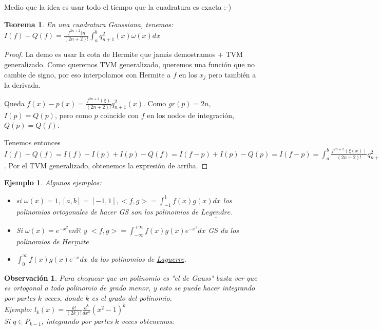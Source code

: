 \documentclass[10pt,a4paper,final]{report}
\newtheorem{theorem}{Teorema}
\newtheorem{observation}{Observación}
\newtheorem{example}{Ejemplo}
\begin{document}
{Medio que la idea es usar todo el tiempo que la cuadratura es exacta :-)

\begin{theorem}
En una cuadratura Gaussiana, tenemos:
	$I(f) - Q(f) = \frac{f^{2n+2}(\eta}{(2n+2)!} \int_a^b q_{n+1}^2(x) \omega(x) dx$
\end{theorem}

\begin{proof}
	La demo es usar la cota de Hermite que jamás demostramos + TVM generalizado. Como queremos TVM generalizado, queremos una función que no cambie de signo, por eso interpolamos con Hermite a $f$ en los $x_j$ pero también a la derivada.
	
	Queda $f(x) - p(x) = \frac{f^{2n+2}(\xi)}{(2n+2)!} q_{n+1}^2(x)$. Como $gr(p) = 2n$, $I(p) = Q(p)$, pero como $p$ coincide con $f$ en los nodos de integración, $Q(p)=Q(f)$.
	
	Tenemos entonces $I(f)-Q(f) = I(f) - I(p) + I(p) - Q(f) = I(f-p) + I(p) - Q(p) = I(f-p) = \int_a^b  \frac{f^{2n+2}(\xi(x))}{(2n+2)!} q_{n+1}^2(x) dx$. Por el TVM generalizado, obtenemos la expresión de arriba.
\end{proof}

\begin{example}
Algunos ejemplos:

\begin{itemize}
	\item si $\omega(x) = 1, [a,b]= [-1,1], <f,g> = \int_{-1}^1 f(x)g(x) dx$ los polinomios ortogonales de hacer GS son los polinomios de $\underline{Legendre}$.
	\item Si $\omega(x) = e^{-x^2} en \mathbb{R}$ y $<f,g> = \int_{-\infty}^{+\infty} f(x) g(x) e^{-x^2} dx$ GS da los polinomios de $\underline{Hermite}$
	\item $\int_0^\infty f(x) g(x) e^{-x} dx$ da los polinomios de \underline{Laguerre}.
\end{itemize}
\end{example}

\begin{observation}
	Para chequear que un polinomio es "el de Gauss" basta ver que es ortogonal a todo polinomio de grado menor, y esto se puede hacer integrando por partes $k$ veces, donde $k$ es el grado del polinomio.\\
	
	Ejemplo: $l_k(x) = \frac{k!}{(2k)!} \frac{d^k}{dx^k}(x^2-1)^k$\\
	
	Si $q\in P_{k-1}$, integrando por partes $k$ veces obtenemos:\\
	

\end{observation}}
\end{document}
